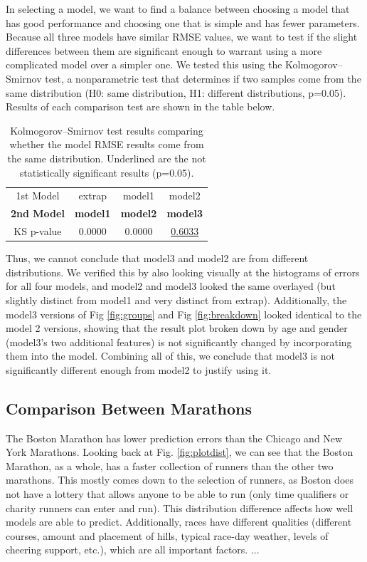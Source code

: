 \documentclass[USenglish,twocolumn]{article}
\theoremstyle{dgthm}
\theoremstyle{dgdef}
\begin{document}
In selecting a model, we want to find a balance between choosing a model that has good performance and choosing one that is simple and has fewer parameters. Because all three models have similar RMSE values, we want to test if the slight differences between them are significant enough to warrant using a more complicated model over a simpler one. We tested this using the Kolmogorov–Smirnov test, a nonparametric test that determines if two samples come from the same distribution (H0: same distribution, H1: different distributions, p=0.05). Results of each comparison test are shown in the table below.

\begin{table}[!ht]
\centering
\begin{tabular}{c|ccc}
1st Model & extrap & model1 & model2 \\ %
\textbf{2nd Model} & \textbf{model1} & \textbf{model2} & \textbf{model3} \\ \midrule
KS p-value & 0.0000 & 0.0000 & \underline{0.6033} \\
 \end{tabular}
 \caption{Kolmogorov–Smirnov test results comparing whether the model RMSE results come from the same distribution. Underlined are the not statistically significant results (p=0.05).}
 \label{tab:kstest}
 \end{table}

Thus, we cannot conclude that model3 and model2 are from different distributions. We verified this by also looking visually at the histograms of errors for all four models, and model2 and model3 looked the same overlayed (but slightly distinct from model1 and very distinct from extrap). Additionally, the model3 versions of Fig \ref{fig:groups} and Fig \ref{fig:breakdown} looked identical to the model 2 versions, showing that the result plot broken down by age and gender (model3's two additional features) is not significantly changed by incorporating them into the model. Combining all of this, we conclude that model3 is not significantly different enough from model2 to justify using it.

\subsection{Comparison Between Marathons}
\label{marathoncomparesection}

The Boston Marathon has lower prediction errors than the Chicago and New York Marathons. Looking back at Fig. \ref{fig:plotdist}, we can see that the Boston Marathon, as a whole, has a faster collection of runners than the other two marathons. This mostly comes down to the selection of runners, as Boston does not have a lottery that allows anyone to be able to run (only time qualifiers or charity runners can enter and run). This distribution difference affects how well models are able to predict. Additionally, races have different qualities (different courses, amount and placement of hills, typical race-day weather, levels of cheering support, etc.), which are all important factors. ...
\end{document}
